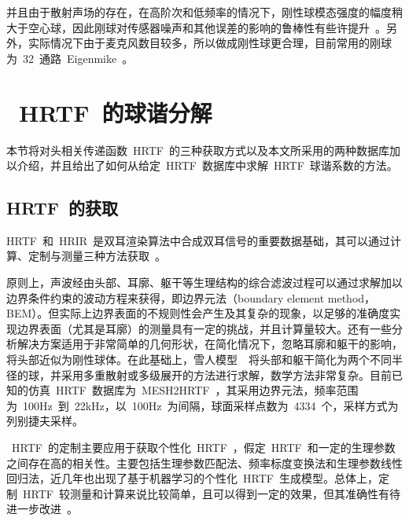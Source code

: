 并且由于散射声场的存在，在高阶次和低频率的情况下，刚性球模态强度的幅度稍大于空心球，因此刚球对传感器噪声和其他误差的影响的鲁棒性有些许提升~。另外，实际情况下由于麦克风数目较多，所以做成刚性球更合理，目前常用的刚球为~32~通路~Eigenmike~。

%
%

\section{~HRTF~的球谐分解}\label{sec.SHcoe_HRTF}

本节将对头相关传递函数~HRTF~的三种获取方式以及本文所采用的两种数据库加以介绍，并且给出了如何从给定~HRTF~数据库中求解~HRTF~球谐系数的方法。


\subsection{HRTF~的获取}
HRTF~和~HRIR~是双耳渲染算法中合成双耳信号的重要数据基础，其可以通过计算、定制与测量三种方法获取~。

原则上，声波经由头部、耳廓、躯干等生理结构的综合滤波过程可以通过求解加以边界条件约束的波动方程来获得，即边界元法（boundary element method，BEM）。但实际上边界表面的不规则性会产生及其复杂的现象，以足够的准确度实现边界表面（尤其是耳廓）的测量具有一定的挑战，并且计算量较大。还有一些分析解决方案适用于非常简单的几何形状，在简化情况下，忽略耳廓和躯干的影响，将头部近似为刚性球体。在此基础上，雪人模型~~将头部和躯干简化为两个不同半径的球，并采用多重散射或多级展开的方法进行求解，数学方法非常复杂。目前已知的仿真~HRTF~数据库为~MESH2HRTF~，其采用边界元法，频率范围为~100Hz~到~22kHz，以~100Hz~为间隔，球面采样点数为~4334~个，采样方式为列别捷夫采样。

~HRTF~的定制主要应用于获取个性化~HRTF~，假定~HRTF~和一定的生理参数之间存在高的相关性。主要包括生理参数匹配法、频率标度变换法和生理参数线性回归法，近几年也出现了基于机器学习的个性化~HRTF~生成模型。总体上，定制~HRTF~较测量和计算来说比较简单，且可以得到一定的效果，但其准确性有待进一步改进~。%

